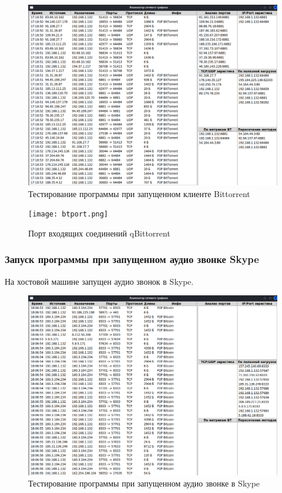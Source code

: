 \documentclass[bachelor, och, coursework]{SCWorks}
\begin{document}
\begin{figure}[H]
    \centering
    \includegraphics[width=0.999\textwidth]{test3.png}
    \caption{Тестирование программы при запущенном клиенте Bittorrent}
    \label{test3}
\end{figure}

\begin{figure}[H]
    \centering
    \texttt{[image: btport.png]}
    \caption{Порт входящих соединений qBittorrent}
    \label{btport}
\end{figure}

\newpage
\subsubsection{Запуск программы при запущенном аудио звонке Skype}
На хостовой машине запущен аудио звонок в Skype.

\begin{figure}[H]
    \centering
    \includegraphics[width=0.999\textwidth]{test4.png}
    \caption{Тестирование программы при запущенном аудио звонке в Skype}
    \label{test4}
\end{figure}
\end{document}
